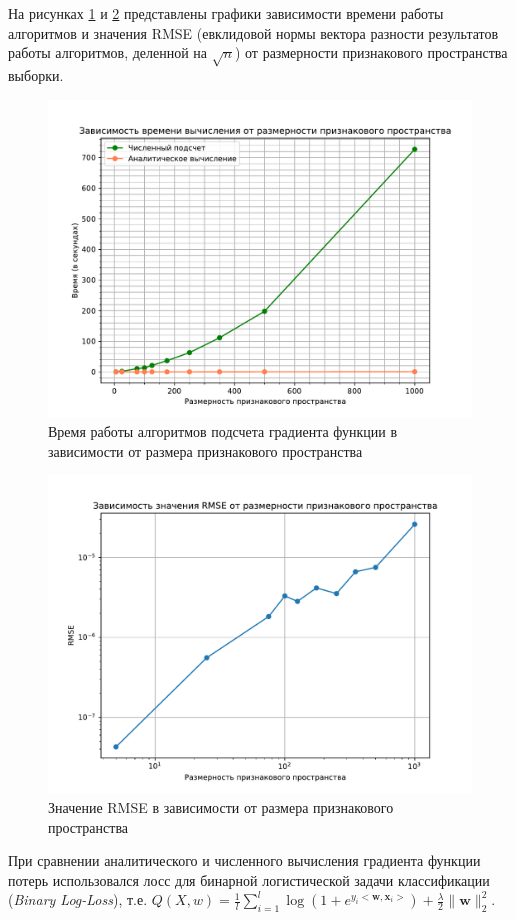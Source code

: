 \documentclass[14pt]{extarticle}
\begin{document}
На рисунках \hyperref[fig:testic]{1} и \hyperref[fig:exp_3_rmse_dim]{2} представлены графики зависимости времени работы алгоритмов и значения RMSE (евклидовой нормы вектора разности результатов работы алгоритмов, деленной на \(\sqrt{n}\)) от размерности признакового пространства выборки.

\begin{figure}[H]
    \centering
    \includegraphics[width=0.65\linewidth]
    {exp_3_time_dim.pdf}
    \caption{Время работы алгоритмов подсчета градиента функции в зависимости от размера признакового пространства}
    \label{fig:testic}
\end{figure}

\begin{figure}[H]
    \centering
    \includegraphics[width=0.65\linewidth]
    {exp_3_rmse_dim.pdf}
    \caption{Значение RMSE в зависимости от размера признакового пространства}
    \label{fig:exp_3_rmse_dim}
\end{figure}

При сравнении аналитического и численного вычисления градиента функции потерь использовался лосс для бинарной логистической задачи классификации (\textit{Binary Log-Loss}), т.е. $ Q(X, w) = \frac{1}{l} \sum_{i=1}^{l} \log\left(1 + e^{y_i <\mathbf{w}, \mathbf{x}_i>}\right ) + \frac{\lambda}{2} \|\mathbf{w}\|_2^2 $.
\end{document}
